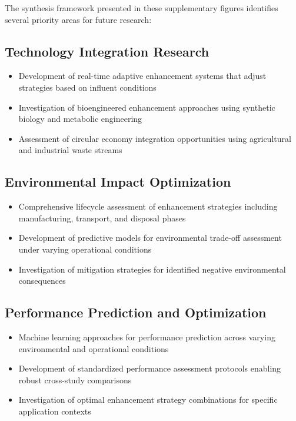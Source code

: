 \documentclass[12pt,a4paper]{article}
\begin{document}
The synthesis framework presented in these supplementary figures identifies several priority areas for future research:

\subsection{Technology Integration Research}

\begin{itemize}
\item Development of real-time adaptive enhancement systems that adjust strategies based on influent conditions
\item Investigation of bioengineered enhancement approaches using synthetic biology and metabolic engineering
\item Assessment of circular economy integration opportunities using agricultural and industrial waste streams
\end{itemize}

\subsection{Environmental Impact Optimization}

\begin{itemize}
\item Comprehensive lifecycle assessment of enhancement strategies including manufacturing, transport, and disposal phases
\item Development of predictive models for environmental trade-off assessment under varying operational conditions
\item Investigation of mitigation strategies for identified negative environmental consequences
\end{itemize}

\subsection{Performance Prediction and Optimization}

\begin{itemize}
\item Machine learning approaches for performance prediction across varying environmental and operational conditions
\item Development of standardized performance assessment protocols enabling robust cross-study comparisons
\item Investigation of optimal enhancement strategy combinations for specific application contexts
\end{itemize}
\end{document}
